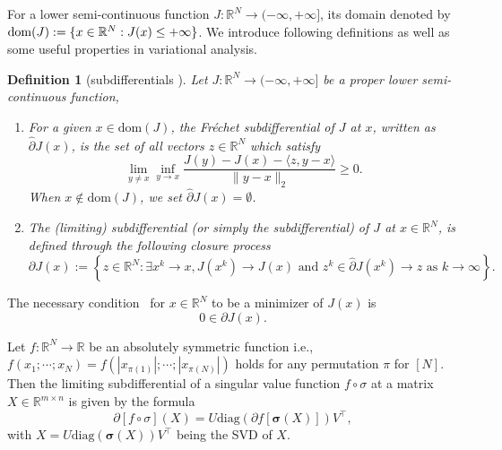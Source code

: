 \documentclass[twoside,11pt]{article}
\newtheorem{Def}{Definition}
\numberwithin{equation}{section}
\begin{document}
For a lower semi-continuous function $J:\mathbb{R}^{N}\to (-\infty,+\infty] $, its domain denoted by ${\rm dom} (J):=\{x\in\mathbb{R}^{N}:J (x)\le+\infty\}$. We introduce following definitions as well as some useful properties in variational analysis.
\begin{Def}[subdifferentials  \cite{NA_sgv_1}] Let $J:\mathbb{R}^{N}\to  (-\infty,+\infty] $ be a proper lower semi-continuous function, 
  \begin{enumerate}
    \item For a given $x\in\mathrm{dom} (J) $, the Fr\'{e}chet subdifferential of $J$ at $x$, written as $\hat{\partial}J (x) $, is the set of all vectors $z\in\mathbb{R}^{N} $ which satisfy
    \begin{equation*}
      \lim\limits_{y\neq x}\inf\limits_{y\to x} \frac{J (y)-J (x)-\langle z,y-x \rangle }{\|y-x\|_{2}} \ge 0.      
    \end{equation*}
    When $x\notin \mathrm{dom}  (J) $, we set $\hat{\partial} J (x)=\emptyset $. 
    \item The (limiting) subdifferential  (or simply the subdifferential) of $J$ at $x\in\mathbb{R}^{N} $, is defined through the following closure process
    \begin{equation*}
      \partial J (x) := \left\{z\in\mathbb{R}^{N}:\exists x^{k}{\to}x, J(x^{k})\to{J}(x)  \text{ and } z^{k}\in\hat{\partial}J (x^{k})\to{z} \text{ as } k\to\infty\right\}.
    \end{equation*}
  \end{enumerate}
\end{Def}
The necessary condition~\cite{opt_simu_svd_2017} for $x\in\mathbb{R}^{N}$ to be a minimizer of $J(x)$ is 
\begin{equation}\label{opt_pri_pro}
    0\in\partial J(x) .
\end{equation}

\begin{lemma} \label{lem_partial_sp} 
Let $f:\mathbb{R}^{N}\to\mathbb{R} $ be an absolutely symmetric function {i.e.}, $f (x_{1};\cdots;x_{N}) = f(|x_{\pi (1)}|;\cdots; |x_{\pi(N)}|) $ holds for any permutation $\pi $ for $[N] $. Then the limiting subdifferential of a singular value function $f\circ\sigma $ at a matrix $X\in\mathbb{R}^{m\times n} $ is given by the formula
  \begin{equation*}
    \partial[f\circ\sigma] (X) = U\mathrm{diag} \left(\partial f[\bm{\sigma} (X)]\right)V^{\top}, 
  \end{equation*}
  with $X=U\mathrm{diag} (\bm{\sigma} (X))V^{\top} $ being the SVD of $X $.
\end{lemma}
\end{document}

